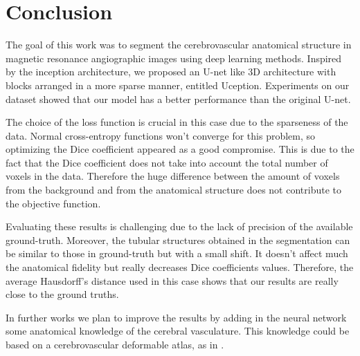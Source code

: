 \documentclass{article}
\begin{document}
\section{Conclusion}

The goal of this work was to segment the cerebrovascular anatomical structure in magnetic resonance angiographic images using deep learning methods. Inspired by the inception architecture, we proposed an U-net like 3D architecture with blocks arranged in a more sparse manner, entitled Uception. Experiments on our dataset showed that our model has a better performance than the original U-net.

The choice of the loss function is crucial in this case due to the sparseness of the data. Normal cross-entropy functions won't converge for this problem, so optimizing the Dice coefficient appeared as a good compromise. This is due to the fact that the Dice coefficient does not take into account the total number of voxels in the data. Therefore the huge difference between the amount of voxels from the background and from the anatomical structure does not contribute to the objective function.

Evaluating these results is challenging due to the lack of precision of the available ground-truth. Moreover, the tubular structures obtained in the segmentation can be similar to those in ground-truth but with a small shift. It doesn't affect much the anatomical fidelity but really decreases Dice coefficients values. Therefore, the average Hausdorff's distance used in this case shows that our results are really close to the ground truths.

In further works we plan to improve the results by adding in the neural network some anatomical knowledge of the cerebral vasculature. This knowledge could be based on a cerebrovascular deformable atlas, as in \cite{Dufour:2013}.






\end{document}
